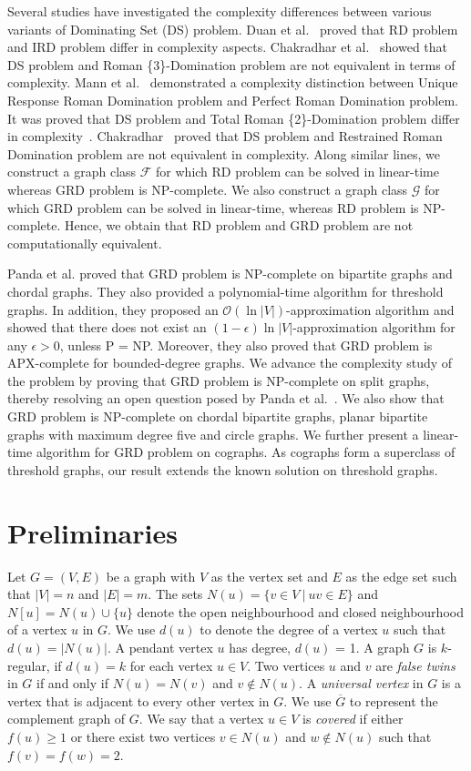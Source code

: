 \documentclass[preprint,12pt]{elsarticle}
\newcommand{\rthd}{{\sc Roman \{3\}-Domination}}
\newcommand{\resd}{{\sc Restrained Roman Domination}}
\newcommand{\urrd}{{\sc Unique Response Roman Domination}}
\newcommand{\prd}{{\sc Perfect Roman Domination}}
\newcommand{\ds}{{\sc Dominating Set}}
\newcommand{\trtd}{{\sc Total Roman \{2\}-Domination}}
\begin{document}
Several studies have investigated the complexity differences between various variants of \ds{} (DS) problem. Duan et al.~\cite{duan2022independent} proved that RD problem and IRD problem differ in complexity aspects. Chakradhar et al.~\cite{chakradhar2022algorithmic} showed that DS problem and \rthd{} problem are not equivalent in terms of complexity. Mann et al.~\cite{fernau2023perfect} demonstrated a complexity distinction between \urrd{} problem and \prd{} problem. It was proved that DS problem and \trtd{} problem differ in complexity~\cite{chakradhar2022roman2}. Chakradhar~\cite{chakradhar2023complexity} proved that DS problem and \resd{} problem are not equivalent in complexity. Along similar lines, we construct a graph class $\mathcal{F}$ for which RD problem can be solved in linear-time whereas GRD problem is NP-complete. We also construct a graph class $\mathcal{G}$ for which GRD problem can be solved in linear-time, whereas RD problem is NP-complete. Hence, we obtain that RD problem and GRD problem are not computationally equivalent.

Panda et al. \cite{panda} proved that GRD problem is NP-complete on bipartite graphs and chordal graphs. They also provided a polynomial-time algorithm for threshold graphs. In addition, they proposed an $\mathcal{O}(\ln{|V|})$-approximation algorithm and showed that there does not exist an $(1-\epsilon)\ln{|V|}$-approximation algorithm for any $\epsilon > 0$, unless P = NP. Moreover, they also proved that GRD problem is APX-complete for bounded-degree graphs. We advance the complexity study of the problem by proving that GRD problem is NP-complete on split graphs, thereby resolving an open question posed by Panda et al.~\cite{panda}. We also show that GRD problem is NP-complete on chordal bipartite graphs, planar bipartite graphs with maximum degree five and circle graphs. We further present a linear-time algorithm for GRD problem on cographs. As cographs form a superclass of threshold graphs, our result extends the known solution on threshold graphs.
\section{Preliminaries}
Let $G = (V, E)$ be a graph with $V$ as the vertex set and $E$ as the edge set such that $|V| = n$ and $|E| = m$. The sets $N(u) = \{v \in V~|~uv\in E\}$ and $N[u]= N(u) \cup \{u\}$ denote the open neighbourhood and closed neighbourhood of a vertex $u$ in $G$. We use $d(u)$ to denote the degree of a vertex $u$ such that $d(u) = |N(u)|$. A pendant vertex $u$ has degree, $d(u)$ = 1. A graph $G$ is $k$-regular, if $d(u) = k$ for each vertex $u \in V$. Two vertices $u$ and $v$ are \textit{false twins} in $G$ if and only if $N(u) = N(v)$ and $v \notin N(u)$. A \textit{universal vertex} in $G$ is a vertex that is adjacent to every other vertex in $G$. We use $\overline{G}$ to represent the complement graph of $G$. We say that a vertex $u \in V$ is \textit{covered} if either $f(u) \geq 1$ or there exist two vertices $v \in N(u)$ and $w \notin N(u)$ such that $f(v) = f(w) = 2$.  
\end{document}
